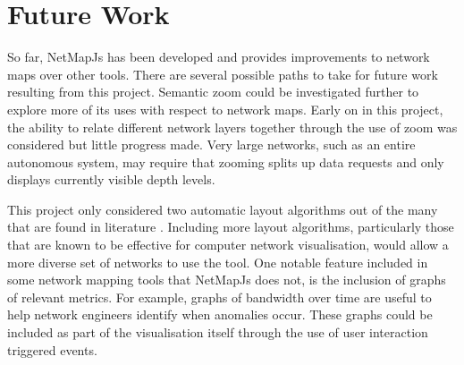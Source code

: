 \documentclass[11pt, a4paper]{article}
\begin{document}
\newpage

\section{Future Work}
\label{sec:future-work}

So far, NetMapJs has been developed and provides improvements to network maps
over other tools. There are several possible paths to take for future work
resulting from this project. Semantic zoom could be investigated further to
explore more of its uses with respect to network maps. Early on in this project,
the ability to relate different network layers together through the use of zoom
was considered but little progress made. Very large networks, such as an entire
autonomous system, may require that zooming splits up data requests and only
displays currently visible depth levels. 

This project only considered two automatic layout algorithms out of the many
that are found in literature \cite{Battista_1994}. Including more layout
algorithms, particularly those that are known to be effective for computer
network visualisation, would allow a more diverse set of networks to use the
tool. One notable feature included in some network mapping tools that NetMapJs
does not, is the inclusion of graphs of relevant metrics. For example, graphs of
bandwidth over time are useful to help network engineers identify when anomalies
occur. These graphs could be included as part of the visualisation itself
through the use of user interaction triggered events.
\end{document}
